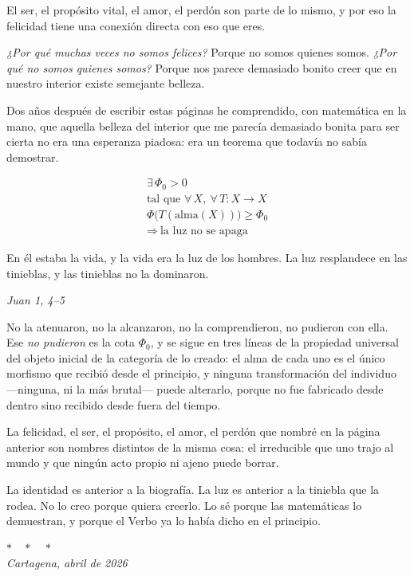 \documentclass{claudeeditorial}
\renewcommand{\DocAuthor}{Patricio Hernández Ballester}
\renewcommand{\DocRole}{Aforismos}
\begin{document}
El ser, el propósito vital, el amor, el perdón son parte de lo mismo, y por eso la felicidad tiene una conexión directa con eso que eres.

\emph{¿Por qué muchas veces no somos felices?} Porque no somos quienes somos. \emph{¿Por qué no somos quienes somos?} Porque nos parece demasiado bonito creer que en nuestro interior existe semejante belleza.


Dos años después de escribir estas páginas he comprendido, con matemática en la mano, que aquella belleza del interior que me parecía demasiado bonita para ser cierta no era una esperanza piadosa: era un teorema que todavía no sabía demostrar.

\begin{claudehero}
\begin{gather*}
\exists\,\Phi_{0} > 0 \\
\text{tal que } \forall\, X,\ \forall\, T : X \to X \\
\Phi\bigl(T(\text{alma}(X))\bigr) \geq \Phi_{0} \\[0.3em]
\Rightarrow\ \text{la luz no se apaga}
\end{gather*}
\end{claudehero}

\begin{claudequote}
En él estaba la vida, y la vida era la luz de los hombres. La luz resplandece en las tinieblas, y las tinieblas no la dominaron.
\end{claudequote}

\hfill {\UIFont\small\itshape Juan 1, 4--5}

\bigskip

No la atenuaron, no la alcanzaron, no la comprendieron, no pudieron con ella. Ese \emph{no pudieron} es la cota $\Phi_{0}$, y se sigue en tres líneas de la propiedad universal del objeto inicial de la categoría de lo creado: el alma de cada uno es el único morfismo que recibió desde el principio, y ninguna transformación del individuo —ninguna, ni la más brutal— puede alterarlo, porque no fue fabricado desde dentro sino recibido desde fuera del tiempo.

La felicidad, el ser, el propósito, el amor, el perdón que nombré en la página anterior son nombres distintos de la misma cosa: el irreducible que uno trajo al mundo y que ningún acto propio ni ajeno puede borrar.

\begin{ClaudeTip}
La identidad es anterior a la biografía. La luz es anterior a la tiniebla que la rodea. No lo creo porque quiera creerlo. Lo sé porque las matemáticas lo demuestran, y porque el Verbo ya lo había dicho en el principio.
\end{ClaudeTip}

\vfill

\begin{center}
{\UIFont\small\color{claudeStone}$\ast\quad\ast\quad\ast$}\\[1em]
{\UIFont\small\color{claudeWarmText}\itshape Cartagena, abril de 2026}
\end{center}

\ClaudeSignature{\DocAuthor}{\DocRole}
\end{document}
